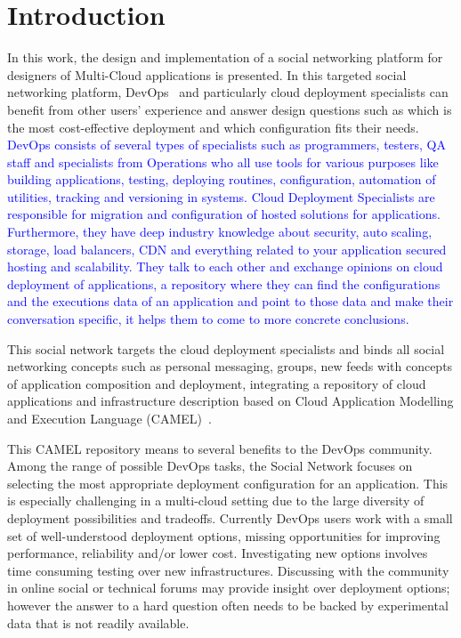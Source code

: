 \chapter{Introduction}
In this work, the design and implementation of a social networking platform for designers of Multi-Cloud applications is presented. In this targeted social networking platform, DevOps~\cite{loukides2012devops} and particularly cloud deployment specialists can benefit from other users' experience and answer design questions such as which is the most cost-effective deployment and which configuration fits their needs. \textcolor{blue}{DevOps consists of several types of specialists such as programmers, testers, QA staff and specialists from Operations who all use tools for various purposes like building applications, testing, deploying routines, configuration, automation of utilities, tracking and versioning in systems.  
Cloud Deployment Specialists are responsible for migration and configuration of hosted solutions for applications. Furthermore, they have deep industry knowledge about security, auto scaling, storage, load balancers, CDN and everything related to your application secured hosting and scalability. They talk to each other and exchange opinions on cloud deployment of applications, a repository where they can find the configurations and the executions data of an application and point to those data and make their conversation specific, it helps them to come to more concrete conclusions.}

This social network targets the cloud deployment specialists and binds all social networking concepts such as personal messaging, groups, new feeds with concepts of application composition and deployment, integrating a repository of cloud applications and infrastructure description based on Cloud Application Modelling and Execution Language (CAMEL)~\cite{paasagedeliverable212}. 

This CAMEL repository means to several benefits to the DevOps community.
Among the range of possible DevOps tasks, the Social Network focuses on selecting the most appropriate deployment
configuration for an application. This is especially challenging in a multi-cloud setting due to the
large diversity of deployment possibilities and tradeoffs. Currently DevOps users work with a small set of
well-understood deployment options, missing opportunities for improving performance, reliability and/or
lower cost. Investigating new options involves time consuming testing over new infrastructures. Discussing
with the community in online social or technical forums may provide insight over deployment options;
however the answer to a hard question often needs to be backed by experimental data that is not readily
available. 

